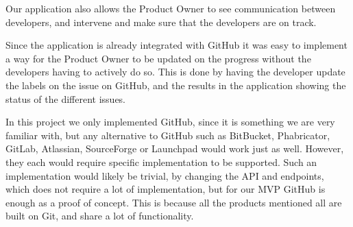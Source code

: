 Our application also allows the Product Owner to see communication between developers, and intervene and make sure that the developers are on track.

Since the application is already integrated with GitHub it was easy to implement a way for the Product Owner to be updated on the progress without the developers having to actively do so.
This is done by having the developer update the labels on the issue on GitHub, and the results in the application showing the status of the different issues. 

In this project we only implemented GitHub, since it is something we are very familiar with, but any alternative to GitHub such as BitBucket, Phabricator, GitLab, Atlassian, SourceForge or Launchpad would work just as well. However, they each would require specific implementation to be supported.
Such an implementation would likely be trivial, by changing the API and endpoints, which does not require a lot of implementation, but for our MVP GitHub is enough as a proof of concept.
This is because all the products mentioned all are built on Git, and share a lot of functionality. 